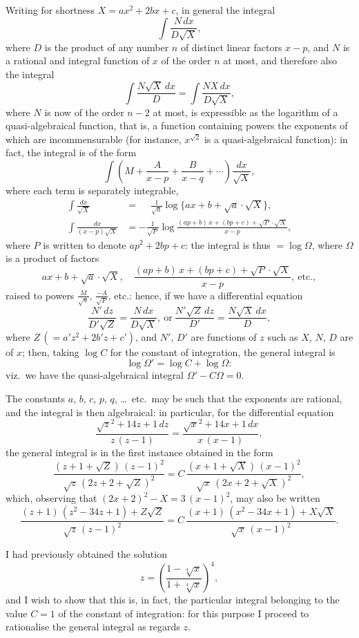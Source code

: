 \documentclass[11pt,a4paper]{book}
\begin{document}
Writing for shortness $X=ax^2+2bx+c$, in general the integral
\[
\int\!\frac{N\,dx}{D\surd X},
\]
where $D$ is the product of any number $n$ of distinct linear factors $x-p$, and $N$ is a rational and integral function of $x$ of the order $n$ at most, and therefore also the integral
\[
\int\!\frac{N\surd X\,dx}{D}=\int\!\frac{NX\,dx}{D\surd X},
\]
where $N$ is now of the order $n-2$ at most, is expressible as the logarithm of a quasi-algebraical function, that is, a function containing powers the exponents of which are incommensurable (for instance, $x^{\surd 2}$ is a quasi-algebraical function): in fact, the integral is of the form
\[
\int\!\left(M+\frac{A}{x-p}+\frac{B}{x-q}+\cdots\right)\frac{dx}{\surd X},
\]
where each term is separately integrable,
\begin{align*}
\int\!\frac{dx}{\surd X}&=\phantom{-}\frac{1}{\surd a}
  \log\{ax+b+\surd a\cdot\surd X\},\\
\int\!\frac{dx}{(x-p)\surd X}&=-\frac{1}{\surd P}
  \log\frac{(ap+b)\,x+(bp+c)+\surd P\cdot\surd X}{x-p},
\end{align*}
where $P$ is written to denote $ap^2+2bp+c$: the integral is thus $=\log\Omega$, where $\Omega$ is a product of factors
\[
ax+b+\surd a\cdot\surd X,\quad
\frac{(ap+b)\,x+(bp+c)+\surd P\cdot\surd X}{x-p},\ \text{etc.},
\]
raised to powers $\frac{M}{\surd a}$, $\frac{-A}{\surd P}$, etc.: hence, if we have a differential equation
\[
\frac{N'\,dz}{D'\surd Z}=\frac{N\,dx}{D\surd X},\ \text{or}\ 
\frac{N'\surd Z\,dz}{D'}=\frac{N\surd X\,dx}{D},
\]
where $Z\,(=a'z^2+2b'z+c')$, and $N'$, $D'$ are functions of $z$ such as $X$, $N$, $D$ are of $x$; then, taking $\log C$ for the constant of integration, the general integral is
\[
\log\Omega'=\log C+\log\Omega:
\]
viz.\ we have the quasi-algebraical integral $\Omega'-C\Omega=0$.

The constants $a$, $b$, $c$, $p$, $q$, \dots\ etc.\ may be such that the exponents are rational, and the integral is then algebraical: in particular, for the differential equation
\[
\frac{\surd z^2+14z+1\,dz}{z\,(z-1)}
=\frac{\surd x^2+14x+1\,dx}{x\,(x-1)},
\]
the general integral is in the first instance obtained in the form
\[
\frac{(z+1+\surd Z)\,(z-1)^2}{\surd z\,(2z+2+\surd Z)^2}
=C\,\frac{(x+1+\surd X)\,(x-1)^2}{\surd x\,(2x+2+\surd X)^2},
\]
which, observing that $(2x+2)^2-X=3\,(x-1)^2$, may also be written
\[
\frac{(z+1)\,(z^2-34z+1)+Z\surd Z}{\surd z\,(z-1)^2}
=C\,\frac{(x+1)\,(x^2-34x+1)+X\surd X}{\surd x\,(x-1)^2}.
\]

I had previously obtained the solution
\[
z=\left(\frac{1-\sqrt[4]{x}}{1+\sqrt[4]{x}}\right)^4,
\]
and I wish to show that this is, in fact, the particular integral belonging to the value $C=1$ of the constant of integration: for this purpose I proceed to rationalise the general integral as regards $z$.
\end{document}
